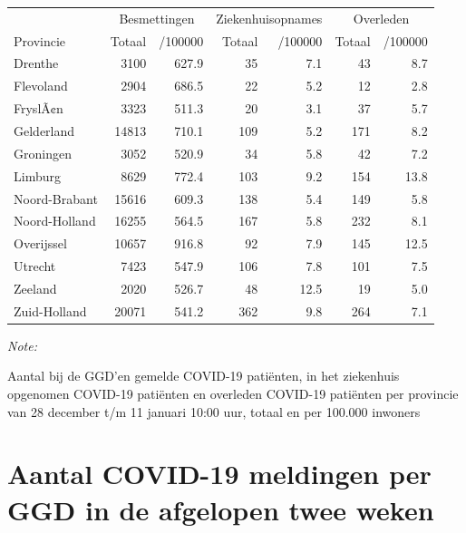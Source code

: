 \documentclass[
  english,
  man,floatsintext]{apa6}
\begin{document}
\begin{table}[H]
\centering
\begin{threeparttable}
\begin{tabular}{lrrrrrr}
\toprule
\multicolumn{1}{c}{ } & \multicolumn{2}{c}{Besmettingen} & \multicolumn{2}{c}{Ziekenhuisopnames} & \multicolumn{2}{c}{Overleden} \\
\cmidrule(l{3pt}r{3pt}){2-3} \cmidrule(l{3pt}r{3pt}){4-5} \cmidrule(l{3pt}r{3pt}){6-7}
Provincie & Totaal & /100000 & Totaal & /100000 & Totaal & /100000\\
\midrule
Drenthe & 3100 & 627.9 & 35 & 7.1 & 43 & 8.7\\
Flevoland & 2904 & 686.5 & 22 & 5.2 & 12 & 2.8\\
FryslÃ¢n & 3323 & 511.3 & 20 & 3.1 & 37 & 5.7\\
Gelderland & 14813 & 710.1 & 109 & 5.2 & 171 & 8.2\\
Groningen & 3052 & 520.9 & 34 & 5.8 & 42 & 7.2\\
Limburg & 8629 & 772.4 & 103 & 9.2 & 154 & 13.8\\
Noord-Brabant & 15616 & 609.3 & 138 & 5.4 & 149 & 5.8\\
Noord-Holland & 16255 & 564.5 & 167 & 5.8 & 232 & 8.1\\
Overijssel & 10657 & 916.8 & 92 & 7.9 & 145 & 12.5\\
Utrecht & 7423 & 547.9 & 106 & 7.8 & 101 & 7.5\\
Zeeland & 2020 & 526.7 & 48 & 12.5 & 19 & 5.0\\
Zuid-Holland & 20071 & 541.2 & 362 & 9.8 & 264 & 7.1\\
\bottomrule
\end{tabular}
\begin{tablenotes}
\item \textit{Note: } 
\item Aantal bij de GGD’en gemelde COVID-19 patiënten, in het ziekenhuis opgenomen COVID-19 patiënten en overleden COVID-19 patiënten per provincie van 28 december t/m 11 januari 10:00 uur, totaal en per 100.000 inwoners
\end{tablenotes}
\end{threeparttable}
\end{table}

\newpage

\hypertarget{aantal-covid-19-meldingen-per-ggd-in-de-afgelopen-twee-weken}{%
\section{Aantal COVID-19 meldingen per GGD in de afgelopen twee weken}\label{aantal-covid-19-meldingen-per-ggd-in-de-afgelopen-twee-weken}}
\end{document}
